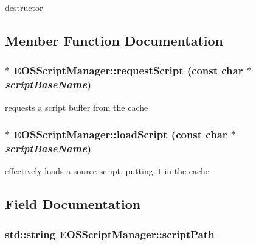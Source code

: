 destructor 



\subsection{Member Function Documentation}
\hypertarget{classEOSScriptManager_70aeb04d3b8e91b0ccf11bf66275ce80}{
\subsubsection[{requestScript}]{ $\ast$ EOSScriptManager::requestScript (const char $\ast$ {\em scriptBaseName})}}
\label{classEOSScriptManager_70aeb04d3b8e91b0ccf11bf66275ce80}


requests a script buffer from the cache 

\hypertarget{classEOSScriptManager_36cf095b56f48611eff8b8fa4698b2e3}{
\subsubsection[{loadScript}]{ $\ast$ EOSScriptManager::loadScript (const char $\ast$ {\em scriptBaseName})}}
\label{classEOSScriptManager_36cf095b56f48611eff8b8fa4698b2e3}


effectively loads a source script, putting it in the cache 



\subsection{Field Documentation}
\hypertarget{classEOSScriptManager_dced2289218a857f35fa61bcf01f728e}{
\subsubsection[{scriptPath}]{\setlength{\rightskip}{0pt plus 5cm}std::string {\bf EOSScriptManager::scriptPath}}}
\label{classEOSScriptManager_dced2289218a857f35fa61bcf01f728e}



